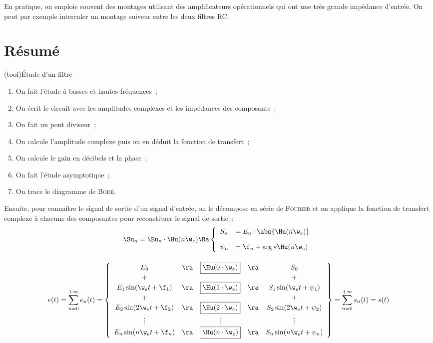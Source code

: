 \documentclass[../../main/main.tex]{subfiles}
\begin{document}
En pratique, on emploie souvent des montages utilisant des amplificateurs
opérationnels qui ont une très grande impédance d'entrée. On peut par exemple
intercaler un montage suiveur entre les deux filtres RC.

\section{Résumé}
\begin{tcb*}[breakable](tool){Étude d'un filtre}
	\begin{enumerate}
		\item On fait l'étude à basses et hautes fréquences~;
		\item On écrit le circuit avec les amplitudes complexes et les impédances des
		      composants~;
		\item On fait un pont diviseur~;
		\item On calcule l'amplitude complexe puis on en déduit la fonction de
		      transfert~;
		\item On calcule le gain en décibels et la phase~;
		\item On fait l'étude asymptotique~;
		\item On trace le diagramme de \textsc{Bode}.
	\end{enumerate}
	Ensuite, pour connaître le signal de sortie d'un signal d'entrée, on le
	décompose en série de \textsc{Fourier} et on applique la fonction de transfert
	complexe à chacune des composantes pour reconstituer le signal de sortie~:
	\begin{gather*}
		\Su_n = \Eu_n \cdot \Hu(n\w_e) \Ra
		\left\{
		\begin{array}{ll}
			S_n    & = E_n \cdot \abs{\Hu(n\w_e)}
			\\[1em]
			\psi_n & = \f_n + \arg*{\Hu(n\w_e)}
		\end{array}
		\right.
		\\[1em]
		e(t) = \sum_{n=0}^{+\infty} e_n(t) =
		\left\{
		\begin{array}{ccccc}
			E_0                     & \ra & \fbox{$\Hu(0\cdot\w_e)$} & \ra & S_0
			\\
			+                       &     &                          &     & +
			\\
			E_1\sin(\w_e t + \f_1)  & \ra & \fbox{$\Hu(1\cdot\w_e)$} & \ra & S_1\sin(\w_e t + \psi_1)
			\\
			+                       &     &                          &     & +
			\\
			E_2\sin(2\w_e t + \f_2) & \ra & \fbox{$\Hu(2\cdot\w_e)$} & \ra & S_2\sin(2\w_e t + \psi_2)
			\\
			\vdots                  &     & \vdots                   &     & \vdots
			\\
			E_n\sin(n\w_e t + \f_n) & \ra & \fbox{$\Hu(n\cdot\w_e)$} & \ra & S_n\sin(n\w_e t + \psi_n)
		\end{array}
		\right\}
		= \sum_{n=0}^{+\infty}s_n(t)
		= s(t)
	\end{gather*}
\end{tcb*}

\vspace*{-15pt}
\end{document}
